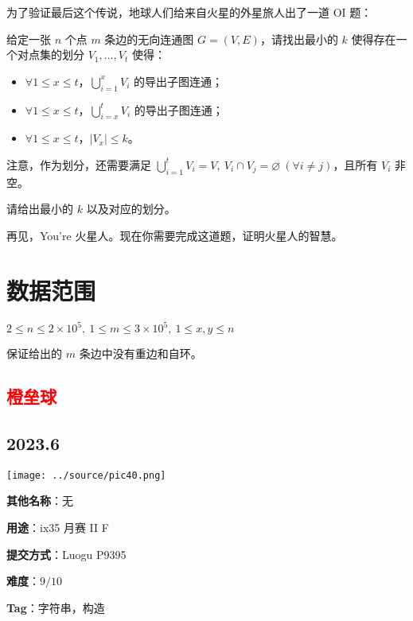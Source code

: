 \documentclass[a4paper,10pt]{article}
\begin{document}
为了验证最后这个传说，地球人们给来自火星的外星旅人出了一道 OI 题：


给定一张 $n$ 个点 $m$ 条边的无向连通图 $G=(V,E)$，请找出最小的 $k$ 使得存在一个对点集的划分 $V_1,\ldots,V_t$ 使得：

\begin{itemize}
\item $\forall 1\leq x\leq t$，$\bigcup_{i=1}^x V_i$ 的导出子图连通；

\item $\forall 1\leq x\leq t$，$\bigcup_{i=x}^t V_i$ 的导出子图连通；

\item $\forall 1\leq x\leq t$，$|V_x|\leq k$。
\end{itemize}

注意，作为划分，还需要满足 $\bigcup_{i=1}^t V_i=V,\ V_i\cap V_j=\varnothing\ (\forall i\neq j)$，且所有 $V_i$ 非空。

请给出最小的 $k$ 以及对应的划分。

再见，You're 火星人。现在你需要完成这道题，证明火星人的智慧。

\section*{数据范围}

$2\leq n\leq 2\times 10^5,\ 1\leq m\leq 3\times 10^5,\ 1\leq x,y\leq n$

保证给出的 $m$ 条边中没有重边和自环。

\newpage

\vspace*{\fill}
\begin{center}

\section{\textcolor{red}{橙垒球}}

\subsection*{2023.6}

\vspace{10pt}

\texttt{[image: ../source/pic40.png]}

\vspace{10pt}

\textbf{其他名称}：无

\vspace{10pt}

\textbf{用途}：ix35 月赛 II F

\vspace{10pt}

\textbf{提交方式}：Luogu P9395

\vspace{10pt}

\textbf{难度}：$9/10$

\vspace{10pt}

\textbf{Tag}：字符串，构造

\end{center}
\vspace*{\fill}
\end{document}
